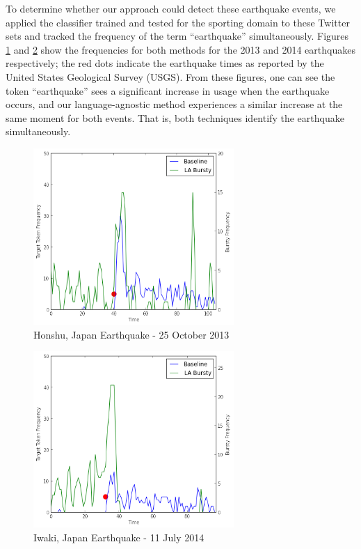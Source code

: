 \documentclass{acm_proc_article-sp}
\begin{document}
To determine whether our approach could detect these earthquake events, we applied the classifier trained and tested for the sporting domain to these Twitter sets and tracked the frequency of the term ``earthquake'' simultaneously.
Figures \ref{fig:2013Japan} and \ref{fig:2014Japan} show the frequencies for both methods for the 2013 and 2014 earthquakes respectively; the red dots indicate the earthquake times as reported by the United States Geological Survey (USGS).
From these figures, one can see the token ``earthquake'' sees a significant increase in usage when the earthquake occurs, and our language-agnostic method experiences a similar increase at the same moment for both events.
That is, both techniques identify the earthquake simultaneously.

\begin{figure}[hbt]
\begin{center}
\includegraphics[width=3in]{./figures/2013-japan-quake.png}
\caption{Honshu, Japan Earthquake - 25 October 2013}
\label{fig:2013Japan}
\end{center}
\end{figure}

\begin{figure}[hbtp]
\begin{center}
\includegraphics[width=3in]{./figures/2014-japan-quake.png}
\caption{Iwaki, Japan Earthquake - 11 July 2014}
\label{fig:2014Japan}
\end{center}
\end{figure}
\end{document}
